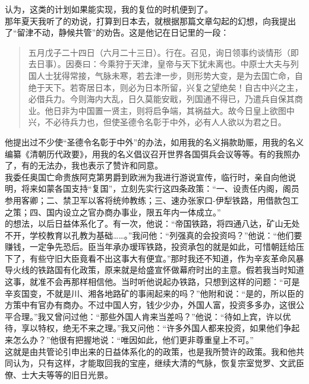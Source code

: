 认为，这类的计划如果能实现，我的复位的时机便到了。\\

那年夏天我听了的劝说，打算到日本去，就根据那篇文章勾起的幻想，向我提出了“留津不动，静候共管”的劝告。这是他记在日记里的一段：\\

\begin{quote}
	五月戊子二十四日（六月二十三日）。行在。召见，询日领事约谈情形（即去日事）。因奏曰：今乘狩于天津，皇帝与天下犹未离也。中原士大夫与列国人士犹得常接，气脉未寒，若去津一步，则形势大变，是为去国亡命，自绝于天下。若寄居日本，则必为日本所留，兴复之望绝矣！自古中兴之主，必借兵力。今则海内大乱，日久莫能安戢，列国通不得已，乃遣兵自保其商业。他日非为中国置一贤主，则将启争端，其祸益大。故今日皇上欲图中兴，不必待兵力也，但使圣德令名彰于中外，必有人人欲以为君之日。\\
\end{quote}

他提出过不少使“圣德令名彰于中外”的办法，如用我的名义捐款助赈，用我的名义编纂《清朝历代政要》，用我的名义倡议召开世界各国弭兵会议等等。有的我照办了，有的无法办，我也表示了赞许和同意。\\

我委任奥国亡命贵族阿克第男爵到欧洲为我进行游说宣传，临行时，亲自向他说明，将来如蒙各国支持“复国”，立刻先实行这四条政策：“一、设责任内阁，阁员参用客卿；二、禁卫军以客将统帅教练；三、速办张家口-伊犁铁路，用借款包工之策；四、国内设立之官办商办事业，限五年内一体成立。”\\

的想法，以后日益体系化了。有一次，他说：“帝国铁路，将四通八达，矿山无处不开，学校教育以孔教为基础……。”我问他：“列强真的会投资吗？”他说：“他们要赚钱，一定争先恐后。臣当年承办瑷珲铁路，投资承包的就是如此，可惜朝廷给压下了，有些守旧大臣竟看不出这事大有便宜。”那时我还不知道，作为辛亥革命风暴导火线的铁路国有化政策，原来就是给盛宣怀做幕府时出的主意。假若我当时知道这事，就准不会再那样相信他。当时听他说起办铁路，只想到这样的问题：“可是辛亥国变，不就是川、湘各地路矿的事闹起来的吗？”他附和说：“是的，所以臣的方策中有官办有商办。不过中国人穷，钱少少办，外国人富，投资多多办，这很公平合理。”我又曾问过他：“那些外国人肯来当差吗？”他说：“待如上宾，许以优待，享以特权，绝无不来之理。”我又问他：“许多外国人都来投资，如果他们争起来怎么办？”他很有把握地说：“唯因如此，他们更非尊重皇上不可。”\\

这就是由共管论引申出来的日益体系化的的政策，也是我所赞许的政策。我和他共同认为，只有这样，才能取回我的宝座，继续大清的气脉，恢复宗室觉罗、文武臣僚、士大夫等等的旧日光景。\\

